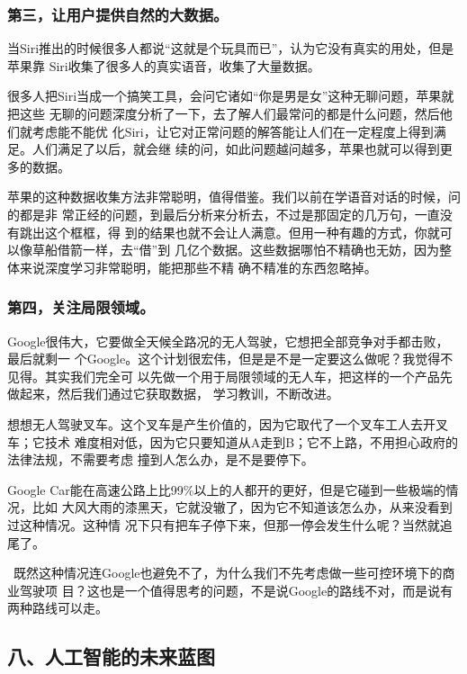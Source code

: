 \documentclass[11pt]{ctexart}
\begin{document}
{{{{\subsubsection{第三，让用户提供自然的大数据。}
\label{sec:orgd1d7e46}

当Siri推出的时候很多人都说“这就是个玩具而已”，认为它没有真实的用处，但是苹果靠
Siri收集了很多人的真实语音，收集了大量数据。

很多人把Siri当成一个搞笑工具，会问它诸如“你是男是女”这种无聊问题，苹果就把这些
无聊的问题深度分析了一下，去了解人们最常问的都是什么问题，然后他们就考虑能不能优
化Siri，让它对正常问题的解答能让人们在一定程度上得到满足。人们满足了以后，就会继
续的问，如此问题越问越多，苹果也就可以得到更多的数据。

苹果的这种数据收集方法非常聪明，值得借鉴。我们以前在学语音对话的时候，问的都是非
常正经的问题，到最后分析来分析去，不过是那固定的几万句，一直没有跳出这个框框，得
到的结果也就不会让人满意。但用一种有趣的方式，你就可以像草船借箭一样，去“借”到
几亿个数据。这些数据哪怕不精确也无妨，因为整体来说深度学习非常聪明，能把那些不精
确不精准的东西忽略掉。

\subsubsection{第四，关注局限领域。}
\label{sec:org75a45a1}

Google很伟大，它要做全天候全路况的无人驾驶，它想把全部竞争对手都击败，最后就剩一
个Google。这个计划很宏伟，但是是不是一定要这么做呢？我觉得不见得。其实我们完全可
以先做一个用于局限领域的无人车，把这样的一个产品先做起来，然后我们通过它获取数据，
学习教训，不断改进。

想想无人驾驶叉车。这个叉车是产生价值的，因为它取代了一个叉车工人去开叉车；它技术
难度相对低，因为它只要知道从A走到B；它不上路，不用担心政府的法律法规，不需要考虑
撞到人怎么办，是不是要停下。

Google Car能在高速公路上比99\%以上的人都开的更好，但是它碰到一些极端的情况，比如
大风大雨的漆黑天，它就没辙了，因为它不知道该怎么办，从来没看到过这种情况。这种情
况下只有把车子停下来，但那一停会发生什么呢？当然就追尾了。

 既然这种情况连Google也避免不了，为什么我们不先考虑做一些可控环境下的商业驾驶项
目？这也是一个值得思考的问题，不是说Google的路线不对，而是说有两种路线可以走。

\subsection{八、人工智能的未来蓝图}
\label{sec:org97a2fbe}

}}}}
\end{document}
